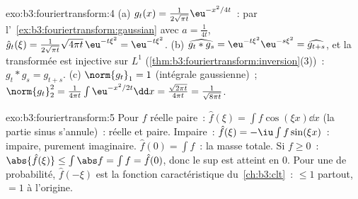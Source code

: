 \begin{solution}{exo:b3:fouriertransform:4}
(a) $g_t(x) = \frac1{2\sqrt{\pi t}}\eu^{-x^2/4t}$~: par
l'~\cref{ex:b3:fouriertransform:gaussian} avec $a = \frac1{4t}$,
$\hat g_t(\xi) = \frac1{2\sqrt{\pi t}}\sqrt{4\pi
t}\,\eu^{-t\xi^2} = \eu^{-t\xi^2}$.
(b) $\widehat{g_t * g_s} = \eu^{-t\xi^2}\eu^{-s\xi^2} =
\widehat{g_{t+s}}$, et la transformée est injective sur $L^1$
(\cref{thm:b3:fouriertransform:inversion}(3))~: $g_t * g_s =
g_{t+s}$.
(c) $\norm{g_t}_1 = 1$ (intégrale gaussienne)~;
$\norm{g_t}_2^2 = \frac1{4\pi t}\int\eu^{-x^2/2t}\dd x =
\frac{\sqrt{2\pi t}}{4\pi t} = \frac1{\sqrt{8\pi t}}$.
\end{solution}

\begin{solution}{exo:b3:fouriertransform:5}
Pour $f$ réelle paire~: $\hat f(\xi) = \int f\cos(\xi x)\dd x$
(la partie sinus s'annule)~: réelle et paire. Impaire~: $\hat
f(\xi) = -\iu\int f\sin(\xi x)$~: impaire, purement
imaginaire. $\hat f(0) = \int f$~: la masse totale. Si $f \geq
0$~: $\abs{\hat f(\xi)} \leq \int\abs f = \int f = \hat
f(0)$, donc le sup est atteint en $0$. Pour une  de
probabilité, $\hat f(-\xi)$ est la fonction caractéristique du~\cref{ch:b3:clt}~:  $\leq 1$ partout, $= 1$ à
l'origine.
\end{solution}

